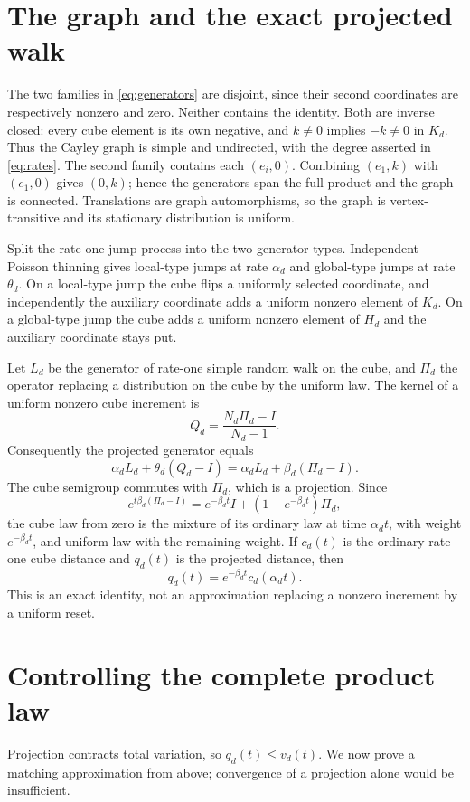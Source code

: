 \documentclass[11pt]{article}
\theoremstyle{remark}\newtheorem{remark}[theorem]{Remark}
\begin{document}
\section{The graph and the exact projected walk}
The two families in \eqref{eq:generators} are disjoint, since their second coordinates are respectively nonzero and zero. Neither contains the identity. Both are inverse closed: every cube element is its own negative, and $k\ne0$ implies $-k\ne0$ in $K_d$. Thus the Cayley graph is simple and undirected, with the degree asserted in \eqref{eq:rates}. The second family contains each $(e_i,0)$. Combining $(e_1,k)$ with $(e_1,0)$ gives $(0,k)$; hence the generators span the full product and the graph is connected. Translations are graph automorphisms, so the graph is vertex-transitive and its stationary distribution is uniform.

Split the rate-one jump process into the two generator types. Independent Poisson thinning gives local-type jumps at rate $\alpha_d$ and global-type jumps at rate $\theta_d$. On a local-type jump the cube flips a uniformly selected coordinate, and independently the auxiliary coordinate adds a uniform nonzero element of $K_d$. On a global-type jump the cube adds a uniform nonzero element of $H_d$ and the auxiliary coordinate stays put.

Let $L_d$ be the generator of rate-one simple random walk on the cube, and $\Pi_d$ the operator replacing a distribution on the cube by the uniform law. The kernel of a uniform nonzero cube increment is
\[
 Q_d=\frac{N_d\Pi_d-I}{N_d-1}.
\]
Consequently the projected generator equals
\begin{equation}\label{eq:reset}
 \alpha_d L_d+\theta_d(Q_d-I)
 =\alpha_d L_d+\beta_d(\Pi_d-I).
\end{equation}
The cube semigroup commutes with $\Pi_d$, which is a projection. Since
\[
 e^{t\beta_d(\Pi_d-I)}=e^{-\beta_dt}I+(1-e^{-\beta_dt})\Pi_d,
\]
the cube law from zero is the mixture of its ordinary law at time $\alpha_dt$, with weight $e^{-\beta_dt}$, and uniform law with the remaining weight. If $c_d(t)$ is the ordinary rate-one cube distance and $q_d(t)$ is the projected distance, then
\begin{equation}\label{eq:projected}
 q_d(t)=e^{-\beta_dt}c_d(\alpha_dt).
\end{equation}
This is an exact identity, not an approximation replacing a nonzero increment by a uniform reset.

\section{Controlling the complete product law}
Projection contracts total variation, so $q_d(t)\le v_d(t)$. We now prove a matching approximation from above; convergence of a projection alone would be insufficient.
\end{document}
